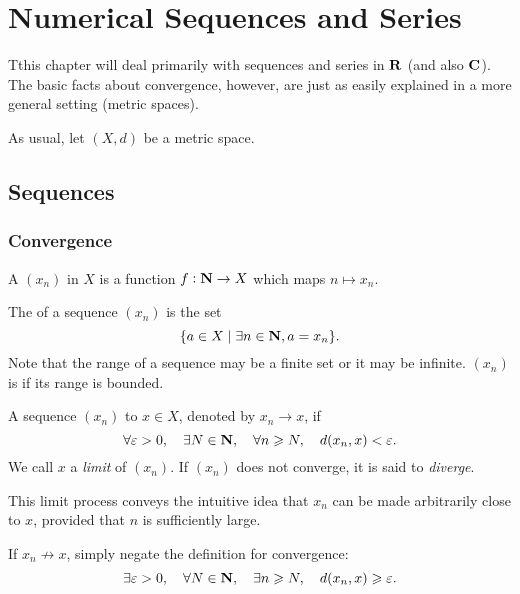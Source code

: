 \chapter{Numerical Sequences and Series}\label{chap:num-seq-series}
Tthis chapter will deal primarily with sequences and series in $\mathbf R$ (and also $\mathbf C$). The basic facts about convergence, however, are just as easily explained in a more general setting (metric spaces).

As usual, let $(X,d)$ be a metric space.

\section{Sequences}
\subsection{Convergence}
\begin{definition}[Sequence]
A  $(x_n)$ in $X$ is a function $f:\mathbf N\to X$ which maps $n\mapsto x_n$.
\end{definition}

\begin{definition}
The  of a sequence $(x_n)$ is the set
\[\{a\in X\mid\exists n\in\mathbf N, a=x_n\}.\]
Note that the range of a sequence may be a finite set or it may be infinite. $(x_n)$ is  if its range is bounded.
\end{definition}

\begin{definition}[Convergence]
A sequence $(x_n)$  to $x\in X$, denoted by $x_n\to x$, if
\[\forall\varepsilon>0,\quad\exists N\in\mathbf N,\quad\forall n\geqslant N,\quad d(x_n,x)<\varepsilon.\]
We call $x$ a \emph{limit} of $(x_n)$. 
If $(x_n)$ does not converge, it is said to \emph{diverge}.
\end{definition}

\begin{remark}
This limit process conveys the intuitive idea that $x_n$ can be made arbitrarily close to $x$, provided that $n$ is sufficiently large.
\end{remark}

\begin{remark}
If $x_n\not\to x$, simply negate the definition for convergence:
\[\exists\varepsilon>0,\quad\forall N\in\mathbf N,\quad\exists n\geqslant N,\quad d(x_n,x)\geqslant\varepsilon.\]
\end{remark}

